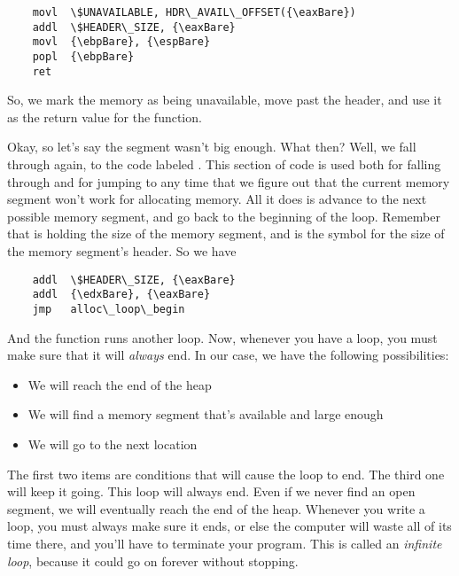 \begin{simpletyping}
\begin{lstlisting}
	movl  \$UNAVAILABLE, HDR\_AVAIL\_OFFSET({\eaxBare})
	addl  \$HEADER\_SIZE, {\eaxBare}
	movl  {\ebpBare}, {\espBare}
	popl  {\ebpBare}
	ret
\end{lstlisting}
\end{simpletyping}

So, we mark the memory as being unavailable, move \icode{{\eaxBare}} past the header,
and use it as the return value for the function.

Okay, so let's say the segment wasn't big enough.  What then?  Well, we fall through
again, to the code labeled .  This section of code
is used both for falling through and for jumping to any time that we figure out that
the current memory segment won't work for allocating memory.  All it does is
advance \icode{{\eaxBare}} to the next possible memory segment, and go back
to the beginning of the loop.   Remember that \icode{{\edxBare}} is holding
the size of the memory segment, and  is the symbol
for the size of the memory segment's header.  So we have

\begin{simpletyping}
\begin{lstlisting}
	addl  \$HEADER\_SIZE, {\eaxBare}
	addl  {\edxBare}, {\eaxBare}
	jmp   alloc\_loop\_begin
\end{lstlisting}
\end{simpletyping}

And the function runs another loop.  Now, whenever you have a loop, you must make sure that
it will \emph{always} end.  In our case, we have the following possibilities:

\begin{itemize}
\item We will reach the end of the heap 
\item We will find a memory segment that's available and large enough 
\item We will go to the next location 
\end{itemize}

The first two items are conditions that will cause the loop to end.  The third one
will keep it going.  This loop will always end.  Even if we never find an open segment, 
we will eventually reach the end of the heap.  Whenever you write a loop, you must
always make sure it ends, or else the computer will waste all of its time there, and
you'll have to terminate your program.   This is called an \emph{infinite loop},
because it could go on forever without stopping.

